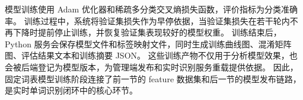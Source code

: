 模型训练使用 Adam 优化器和稀疏多分类交叉熵损失函数，评价指标为分类准确率。
训练过程中，系统将验证集损失作为早停依据，当验证集损失在若干轮内不再下降时提前停止训练，并恢复验证集表现较好的模型权重。
训练结束后，Python 服务会保存模型文件和标签映射文件，同时生成训练曲线图、混淆矩阵图、评估结果文本和训练摘要 JSON。
这些训练产物不仅用于分析模型效果，也会被后端登记为模型版本，为管理端发布和实时识别服务重载提供依据。
因此，固定词表模型训练阶段连接了前一节的 feature 数据集和后一节的模型发布链路，是实时单词识别闭环中的核心环节。
